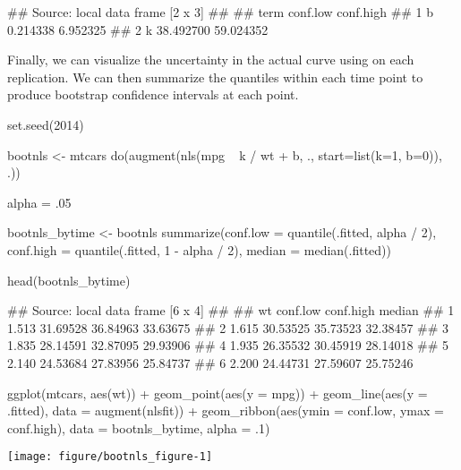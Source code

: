\begin{example}
## Source: local data frame [2 x 3]
## 
##   term  conf.low conf.high
## 1    b  0.214338  6.952325
## 2    k 38.492700 59.024352

\end{example}


% 
% 

Finally, we can visualize the uncertainty in the actual curve using  on each replication. We can then summarize the quantiles within each time point to produce bootstrap confidence intervals at each point.

\begin{center}

\begin{example}
set.seed(2014)
\end{example}

\begin{example}
bootnls <- mtcars %
    do(augment(nls(mpg ~ k / wt + b, ., start=list(k=1, b=0)), .))
\end{example}

\begin{example}
alpha = .05
\end{example}

\begin{example}
bootnls_bytime <- bootnls %
    summarize(conf.low = quantile(.fitted, alpha / 2),
              conf.high = quantile(.fitted, 1 - alpha / 2),
              median = median(.fitted))
\end{example}

\begin{example}
head(bootnls_bytime)
\end{example}

\begin{example}
## Source: local data frame [6 x 4]
## 
##      wt conf.low conf.high   median
## 1 1.513 31.69528  36.84963 33.63675
## 2 1.615 30.53525  35.73523 32.38457
## 3 1.835 28.14591  32.87095 29.93906
## 4 1.935 26.35532  30.45919 28.14018
## 5 2.140 24.53684  27.83956 25.84737
## 6 2.200 24.44731  27.59607 25.75246

\end{example}

\begin{example}
ggplot(mtcars, aes(wt)) + geom_point(aes(y = mpg)) +
    geom_line(aes(y = .fitted), data = augment(nlsfit)) +
    geom_ribbon(aes(ymin = conf.low, ymax = conf.high), data = bootnls_bytime, alpha = .1)
\end{example}

\texttt{[image: figure/bootnls\_figure-1]} 
\end{center}


